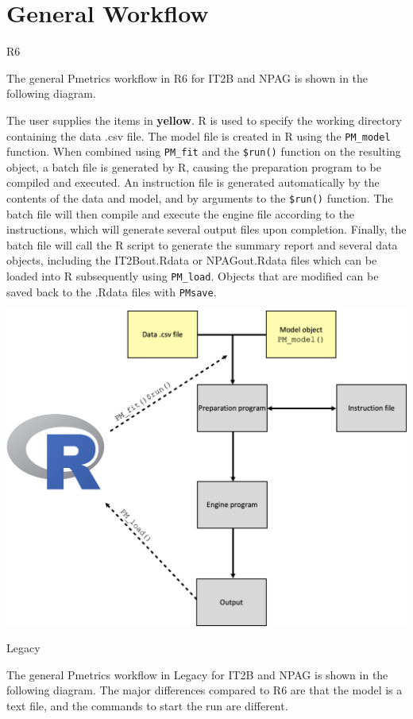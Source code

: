 \documentclass[
]{book}
\begin{document}
\hypertarget{general-workflow}{%
\chapter{General Workflow}\label{general-workflow}}

{R6}

The general Pmetrics workflow in R6 for IT2B and NPAG is shown in the
following diagram.

The user supplies the items in \textbf{yellow}. R is used to specify the working directory containing the data .csv file. The model file is created in R using
the \texttt{PM\_model} function. When combined using \texttt{PM\_fit} and the \texttt{\$run()} function
on the resulting object, a batch file is generated by R, causing the preparation
program to be compiled and executed. An instruction file is generated
automatically by the contents of the data and model, and by
arguments to the \texttt{\$run()} function. The batch file
will then compile and execute the engine file according to the
instructions, which will generate several output files upon completion.
Finally, the batch file will call the R script to generate the summary
report and several data objects, including the IT2Bout.Rdata or
NPAGout.Rdata files which can be loaded into R subsequently using
\texttt{PM\_load}. Objects that are modified can be saved back to the .Rdata
files with \texttt{PMsave}.

\includegraphics{Images/Slide1.png}

{Legacy}

The general Pmetrics workflow in Legacy for IT2B and NPAG is shown in the
following diagram. The major differences compared to R6 are that the model is a text file, and the commands to start the run are different.
\end{document}
